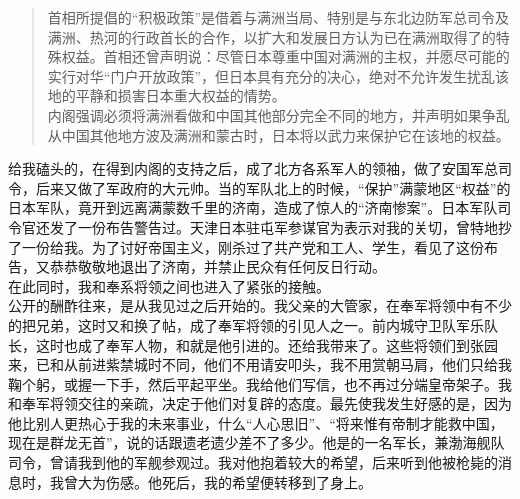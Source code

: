 \begin{quote}
	首相所提倡的“积极政策”是借着与满洲当局、特别是与东北边防军总司令及满洲、热河的行政首长的合作，以扩大和发展日方认为已在满洲取得了的特殊权益。首相还曾声明说：尽管日本尊重中国对满洲的主权，并愿尽可能的实行对华“门户开放政策”，但日本具有充分的决心，绝对不允许发生扰乱该地的平静和损害日本重大权益的情势。\\

内阁强调必须将满洲看做和中国其他部分完全不同的地方，并声明如果争乱从中国其他地方波及满洲和蒙古时，日本将以武力来保护它在该地的权益。\\
\end{quote}

给我磕头的，在得到内阁的支持之后，成了北方各系军人的领袖，做了安国军总司令，后来又做了军政府的大元帅。当的军队北上的时候，“保护”满蒙地区“权益”的日本军队，竟开到远离满蒙数千里的济南，造成了惊人的“济南惨案”。日本军队司令官还发了一份布告警告过。天津日本驻屯军参谋官为表示对我的关切，曾特地抄了一份给我。为了讨好帝国主义，刚杀过了共产党和工人、学生，看见了这份布告，又恭恭敬敬地退出了济南，并禁止民众有任何反日行动。\\

在此同时，我和奉系将领之间也进入了紧张的接触。\\

公开的酬酢往来，是从我见过之后开始的。我父亲的大管家，在奉军将领中有不少的把兄弟，这时又和换了帖，成了奉军将领的引见人之一。前内城守卫队军乐队长，这时也成了奉军人物，和就是他引进的。还给我带来了。这些将领们到张园来，已和从前进紫禁城时不同，他们不用请安叩头，我不用赏朝马肩，他们只给我鞠个躬，或握一下手，然后平起平坐。我给他们写信，也不再过分端皇帝架子。我和奉军将领交往的亲疏，决定于他们对复辟的态度。最先使我发生好感的是，因为他比别人更热心于我的未来事业，什么“人心思旧”、“将来惟有帝制才能救中国，现在是群龙无首”，说的话跟遗老遗少差不了多少。他是的一名军长，兼渤海舰队司令，曾请我到他的军舰参观过。我对他抱着较大的希望，后来听到他被枪毙的消息时，我曾大为伤感。他死后，我的希望便转移到了身上。\\

